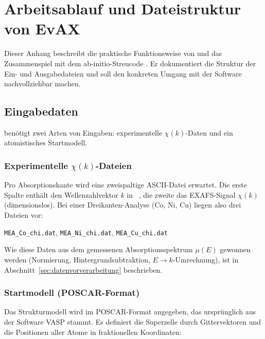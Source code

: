 \chapter{Arbeitsablauf und Dateistruktur von EvAX}
\label{ch:anhang-workflow}

Dieser Anhang beschreibt die praktische Funktionsweise von \evax{}
und das Zusammenspiel mit dem ab-initio-Streucode \feff{}.
Er dokumentiert die Struktur der Ein- und Ausgabedateien und soll
den konkreten Umgang mit der Software nachvollziehbar machen.


\section{Eingabedaten}

\evax{} benötigt zwei Arten von Eingaben:
experimentelle $\chi(k)$-Daten und ein atomistisches Startmodell.

\subsection{Experimentelle $\chi(k)$-Dateien}

Pro Absorptionskante wird eine zweispaltige ASCII-Datei erwartet.
Die erste Spalte enthält den Wellenzahlvektor $k$ in
\si{\per\Angstrom}, die zweite das EXAFS-Signal $\chi(k)$
(dimensionslos).
Bei einer Dreikanten-Analyse (Co, Ni, Cu) liegen also drei Dateien
vor:
\begin{center}
  \texttt{MEA\_Co\_chi.dat},\quad
  \texttt{MEA\_Ni\_chi.dat},\quad
  \texttt{MEA\_Cu\_chi.dat}
\end{center}

Wie diese Daten aus dem gemessenen Absorptionsspektrum $\mu(E)$
gewonnen werden (Normierung, Hintergrundsubtraktion, $E \to k$-Umrechnung),
ist in Abschnitt~\ref{sec:datenvorverarbeitung} beschrieben.

\subsection{Startmodell (POSCAR-Format)}
\label{sec:anhang-poscar}

Das Strukturmodell wird im POSCAR-Format angegeben, das ursprünglich
aus der Software VASP stammt.
Es definiert die Superzelle durch Gittervektoren und die Positionen
aller Atome in fraktionellen Koordinaten:

